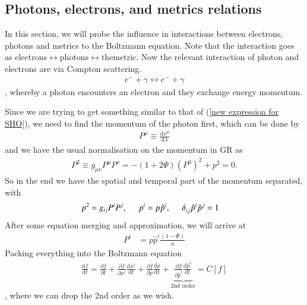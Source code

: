 \documentclass[a4paper, 12pt]{article}
\begin{document}
{{  \subsection{Photons, electrons, and metrics relations}%
    \label{sub:Photons, electrons, and metrics relations}
    In this section, we will probe the influence in interactions between
    electrons, photons and metrics to the Boltzmann equation. Note that
    the interaction goes as \( \mathrm{electrons} \leftrightarrow
    \mathrm{photons} \leftrightarrow \mathrm{the metric}\). Now the
    relevant interaction of photon and electrons are via Compton
    scattering. 
    \begin{align}
      \label{Compton scattering}
      e^- + \gamma \leftrightarrow e^- + \gamma
    \end{align}, whereby a photon encounters an electron and they
    exchange energy momentum. 
    
    Since we are trying to get something similar to that of (\ref{new
    expression for SHO}), we need to find the momentum of the photon
    first, which can be done by 
    \begin{align}
      \label{momentum with affine parameter}
      P^{\mu} \equiv \frac{\mathrm{d}x^{\mu} }{\mathrm{d}\lambda}  
    \end{align}
    and we have the usual normalisation on the momentum in GR as 
    \begin{align}
      \label{momentum constraint}
      P^2 \equiv g_{\mu \nu} P^{\mu} P^{\nu} = - (1 +
      2\Psi)(P^{0} )^2 + p^2 = 0.
    \end{align}
    So in the end we have the spatial and temporal part of the momentum
    separated, with 
    \begin{align}
      \label{spatial momentum}
      p^2 = g_{ij} P^{i} P^{j}, \hspace{0.5cm} p^{i} &= p
      \hat{p}^{i}, \hspace{0.5cm} \delta_{ij}^{}
      \hat{p}^{i} \hat{p}^{j} = 1   
    \end{align} 
   After some equation merging and approximation, we will arrive at 
   \begin{align}
    \label{affine momentum}
     P^{i} &= p \hat{p}^{i} \frac{(1 - \Phi)}{a}   
   \end{align}
   Packing everything into the Boltzmann equation 
   \begin{align}
    \label{metric to Boltzmann equation}
     \frac{\mathrm{d}f}{\mathrm{d}t} = \frac{\partial f}{\partial
     t} + \frac{\partial f}{\partial x^{i} }
     \frac{\mathrm{d}x^{i} }{\mathrm{d}t} + \frac{\partial f}{\partial
     p} \frac{\mathrm{d}p}{\mathrm{d}t} +
     \underbrace{\frac{\partial f}{\partial \hat{p}^{i} }
     \frac{\mathrm{d} \hat{p}^{i} }{\mathrm{d}t}
     }_{\textrm{2nd order}} = C[f] 
   \end{align}, where we can drop the 2nd order as we wish.

}}
\end{document}
